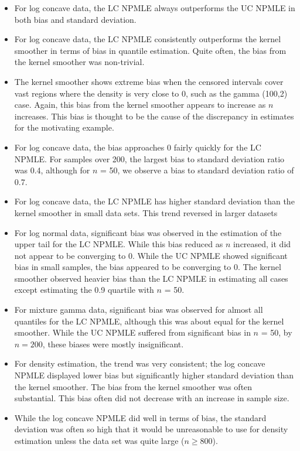 \documentclass[12pt]{article}
\numberwithin{equation}{section}
\begin{document}
\begin{itemize}	
		
	\item For log concave data, the LC NPMLE always outperforms the UC NPMLE in both bias and standard deviation.
	
	\item For log concave data, the LC NPMLE consistently outperforms the kernel smoother in terms of bias in quantile estimation. Quite often, the bias from the kernel smoother was non-trivial. 
				
	\item The kernel smoother shows extreme bias when the censored intervals cover vast regions where the density is very close to 0, such as the gamma (100,2) case. Again, this bias from the kernel smoother appears to increase as $n$ increases. This bias is thought to be the cause of the discrepancy in estimates for the motivating example. 
	
	\item For log concave data, the bias approaches 0 fairly quickly for the LC NPMLE. For samples over 200, the largest bias to standard deviation ratio was 0.4, although for $n$ = 50, we observe a bias to standard deviation ratio of 0.7. 
	
	\item For log concave data, the LC NPMLE has higher standard deviation than the kernel smoother in small data sets. This trend reversed in larger datasets

	\item For log normal data, significant bias was observed in the estimation of the upper tail for the LC NPMLE. While this bias reduced as $n$ increased, it did not appear to be converging to 0. While the UC NPMLE showed significant bias in small samples, the bias appeared to be converging to 0. The kernel smoother observed heavier bias than the LC NPMLE in estimating all cases except estimating the 0.9 quartile with $n$ = 50. 
		
	\item For mixture gamma data, significant bias was observed for almost all quantiles for the LC NPMLE, although this was about equal for the kernel smoother. While the UC NPMLE suffered from significant bias in $n$ = 50, by $n = 200$, these biases were mostly insignificant.
		
	\item For density estimation, the trend was very consistent; the log concave NPMLE displayed lower bias but significantly higher standard deviation than the kernel smoother. The bias from the kernel smoother was often substantial. This bias often did not decrease with an increase in sample size. 
	
	\item While the log concave NPMLE did well in terms of bias, the standard deviation was often so high that it would be unreasonable to use for density estimation unless the data set was quite large ($n \geq 800$). 
\end{itemize}	
\end{document}
